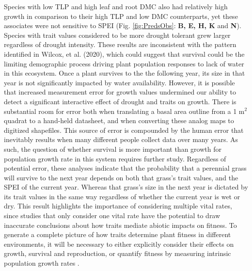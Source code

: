 \documentclass[12pt, letterpaper]{article}
\begin{document}
Species with low TLP and high leaf and root DMC also had relatively high growth in comparison to their high TLP and low DMC counterparts, yet these associates were not sensitive to SPEI (Fig. \ref{fig:PredsObs}: \textbf{B, E, H, K} and \textbf{N}). Species with trait values considered to be more drought tolerant grew larger regardless of drought intensity. These results are inconsistent with the pattern identified in Wilcox, et al. (2020), which could suggest that survival could be the limiting demographic process driving plant population responses to lack of water in this ecosystem. Once a plant survives to the the following year, its size in that year is not significantly impacted by water availability. However, it is possible that increased measurement error for growth values undermined our ability to detect a significant interactive effect of drought and traits on growth. There is substantial room for error both when translating a basal area outline from a 1 m$^2$ quadrat to a hand-held datasheet, and when converting these analog maps to digitized shapefiles. This source of error is compounded by the human error that inevitably results when many different people collect data over many years. As such, the question of whether survival is more important than growth for population growth rate in this system requires further study. Regardless of potential error, these analyses indicate that the probability that a perennial grass will survive to the next year depends on both that grass’s trait values, and the SPEI of the current year. Whereas that grass's size in the next year is dictated by its trait values in the same way regardless of whether the current year is wet or dry. This result highlights the importance of considering multiple vital rates, since studies that only consider one vital rate have the potential to draw inaccurate conclusions about how traits mediate abiotic impacts on fitness. To generate a complete picture of how traits determine plant fitness in different environments, it will be necessary to either explicitly consider their effects on growth, survival and reproduction, or quantify fitness by measuring intrinsic population growth rates \cite{Laughlin2020TheFitness}.
\end{document}
